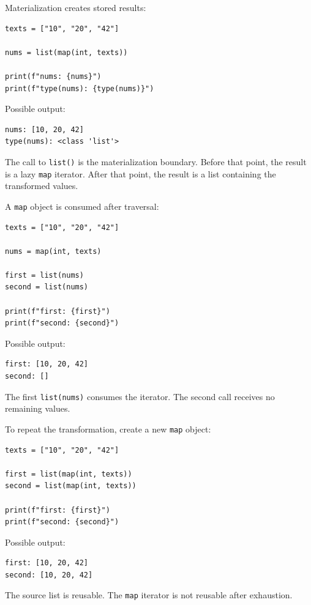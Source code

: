 \documentclass[a4paper,twoside]{report}
\begin{document}
Materialization creates stored results:

\begin{verbatim}
texts = ["10", "20", "42"]

nums = list(map(int, texts))

print(f"nums: {nums}")
print(f"type(nums): {type(nums)}")
\end{verbatim}

Possible output:

\begin{verbatim}
nums: [10, 20, 42]
type(nums): <class 'list'>
\end{verbatim}

The call to \texttt{list()} is the materialization boundary. Before that point, the result is a lazy \texttt{map} iterator. After that point, the result is a list containing the transformed values.

A \texttt{map} object is consumed after traversal:

\begin{verbatim}
texts = ["10", "20", "42"]

nums = map(int, texts)

first = list(nums)
second = list(nums)

print(f"first: {first}")
print(f"second: {second}")
\end{verbatim}

Possible output:

\begin{verbatim}
first: [10, 20, 42]
second: []
\end{verbatim}

The first \texttt{list(nums)} consumes the iterator. The second call receives no remaining values.

To repeat the transformation, create a new \texttt{map} object:

\begin{verbatim}
texts = ["10", "20", "42"]

first = list(map(int, texts))
second = list(map(int, texts))

print(f"first: {first}")
print(f"second: {second}")
\end{verbatim}

Possible output:

\begin{verbatim}
first: [10, 20, 42]
second: [10, 20, 42]
\end{verbatim}

The source list is reusable. The \texttt{map} iterator is not reusable after exhaustion.
\end{document}
